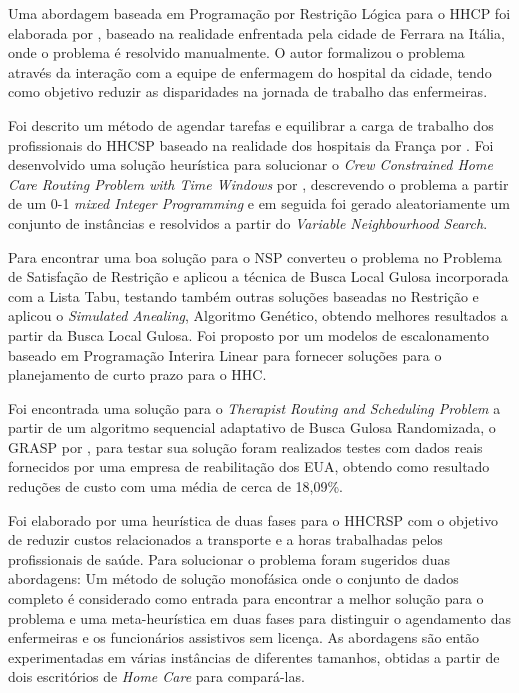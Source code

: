 Uma abordagem baseada em Programação por Restrição Lógica para o \ac{HHCP} foi elaborada por \cite{cattafi:2012}, baseado na realidade enfrentada pela cidade de Ferrara na Itália, onde o problema é resolvido manualmente. O autor formalizou o problema através da interação com a equipe de enfermagem do hospital da cidade, tendo como objetivo reduzir as disparidades na jornada de trabalho das enfermeiras.

Foi descrito um método de agendar tarefas e equilibrar a carga de trabalho dos profissionais do \ac{HHCSP} baseado na realidade dos hospitais da França por \cite{bachouch:2010}. 
Foi desenvolvido uma solução heurística para solucionar o \textit{Crew Constrained Home Care Routing Problem with Time Windows} por \cite{tozlu:2016}, descrevendo o problema a partir de um 0-1 \textit{mixed Integer Programming} e em seguida foi gerado aleatoriamente um conjunto de instâncias e resolvidos a partir do \textit{Variable Neighbourhood Search}. 

Para encontrar uma boa solução para o \ac{NSP} \cite{kundu:2008} converteu o problema no Problema de Satisfação de Restrição e aplicou a técnica de Busca Local Gulosa incorporada com a Lista Tabu, testando também outras soluções baseadas no Restrição e aplicou o \textit{Simulated Anealing}, Algoritmo Genético, obtendo melhores resultados a partir da Busca Local Gulosa.
Foi proposto por \cite{trabelsi:2012} um modelos de escalonamento baseado em Programação Interira Linear para fornecer soluções para o planejamento de curto prazo para o \ac{HHC}.

Foi encontrada uma solução para o \textit{Therapist Routing and Scheduling Problem} a partir de um algoritmo sequencial adaptativo de Busca Gulosa Randomizada, o GRASP por \cite{bard:2012}, para testar sua solução foram realizados testes com dados reais fornecidos por uma empresa de reabilitação dos EUA, obtendo como resultado reduções de custo com uma média de cerca de 18,09\%.

Foi elaborado por \cite{Decerle:2016} uma heurística de duas fases para o \ac{HHCRSP} com o objetivo de reduzir custos relacionados a transporte e a horas trabalhadas pelos profissionais de saúde. Para solucionar o problema foram sugeridos duas abordagens: Um método de solução monofásica onde o conjunto de dados completo é considerado como entrada para encontrar a melhor solução para o problema e uma meta-heurística em duas fases para distinguir o agendamento das enfermeiras e os funcionários assistivos sem licença. As abordagens são então experimentadas em várias instâncias de diferentes tamanhos, obtidas a partir de dois escritórios de \textit{Home Care} para compará-las.

